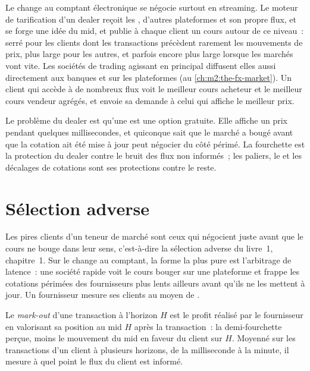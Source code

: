 Le change au comptant électronique se négocie surtout en streaming. Le moteur de tarification d'un dealer
reçoit les , d'autres plateformes et son propre flux, et se forge une idée du
mid, et publie à chaque client un cours autour de ce niveau~: serré pour les clients dont
les transactions précèdent rarement les mouvements de prix, plus large pour les autres, et parfois
encore plus large lorsque les marchés vont vite. Les sociétés de trading agissant en principal diffusent elles aussi
directement aux banques et sur les plateformes (au \cref{ch:m2:the-fx-market}). Un client qui accède à
de nombreux flux voit le meilleur cours acheteur et le meilleur cours vendeur agrégés, et envoie sa
demande à celui qui affiche le meilleur prix.

Le problème du dealer est qu'une  est une option gratuite. Elle affiche un prix pendant
quelques millisecondes, et quiconque sait que le marché a bougé avant que la cotation
ait été mise à jour peut négocier du côté périmé. La fourchette est la protection du
dealer contre le bruit des flux non informés~; les paliers, le  et les décalages de cotations sont
ses protections contre le reste.

\section{Sélection adverse}

Les pires clients d'un teneur de marché sont ceux qui négocient juste avant que le cours ne bouge
dans leur sens, c'est-à-dire la sélection adverse du livre~1, chapitre~1. Sur le change au comptant, la
forme la plus pure est l'arbitrage de latence~: une société rapide voit le cours bouger sur une plateforme
et frappe les cotations périmées des fournisseurs plus lents ailleurs avant qu'ils ne les mettent à jour. Un
fournisseur mesure ses clients au moyen de .

\begin{definition}\label{def:m2:fx-spot-microstructure:markout}
Le \emph{mark-out} d'une transaction à l'horizon $H$ est le profit
réalisé par le fournisseur en valorisant sa position au mid $H$ après la transaction~: la
demi-fourchette perçue, moins le mouvement du mid en faveur du client sur $H$.
Moyenné sur les transactions d'un client à plusieurs horizons, de la milliseconde à la
minute, il mesure à quel point le flux du client est informé.
\end{definition}

